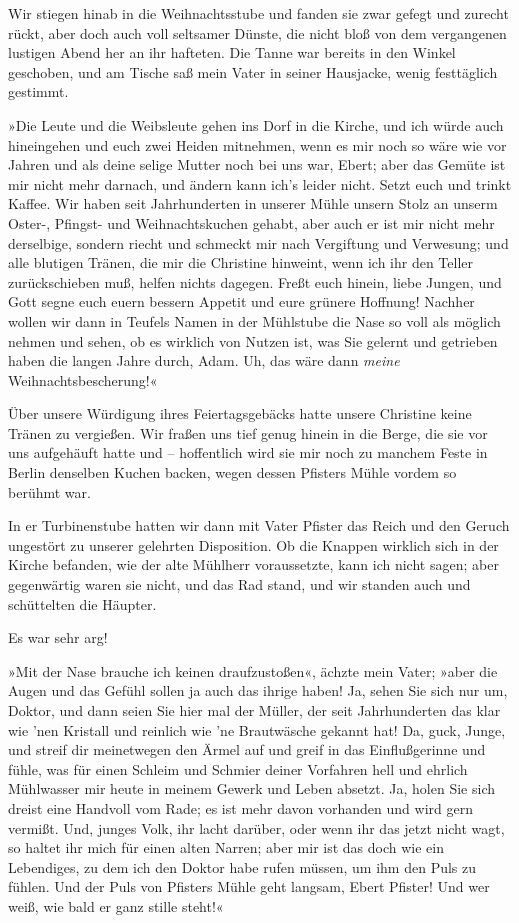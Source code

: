 Wir stiegen hinab in die Weihnachtsstube und fanden sie zwar gefegt
und zurecht rückt, aber doch auch voll seltsamer Dünste, die nicht
bloß von dem vergangenen lustigen Abend her an ihr hafteten. Die
Tanne war bereits in den Winkel geschoben, und am Tische saß mein
Vater in seiner Hausjacke, wenig festtäglich gestimmt.

»Die Leute und die Weibsleute gehen ins Dorf in die Kirche, und ich
würde auch hineingehen und euch zwei Heiden mitnehmen, wenn es mir
noch so wäre wie vor Jahren und als deine selige Mutter noch bei
uns war, Ebert; aber das Gemüte ist mir nicht mehr darnach, und
ändern kann ich's leider nicht. Setzt euch und trinkt Kaffee. Wir
haben seit Jahrhunderten in unserer Mühle unsern Stolz an unserm
Oster-, Pfingst- und Weihnachtskuchen gehabt, aber auch er ist mir
nicht mehr derselbige, sondern riecht und schmeckt mir nach
Vergiftung und Verwesung; und alle blutigen Tränen, die mir die
Christine hinweint, wenn ich ihr den Teller zurückschieben muß,
helfen nichts dagegen. Freßt euch hinein, liebe Jungen, und Gott
segne euch euern bessern Appetit und eure grünere Hoffnung! Nachher
wollen wir dann in Teufels Namen in der Mühlstube die Nase so voll
als möglich nehmen und sehen, ob es wirklich von Nutzen ist, was
Sie gelernt und getrieben haben die langen Jahre durch, Adam. Uh,
das wäre dann \emph{meine} Weihnachtsbescherung!«

Über unsere Würdigung ihres Feiertagsgebäcks hatte unsere Christine
keine Tränen zu vergießen. Wir fraßen uns tief genug hinein in die
Berge, die sie vor uns aufgehäuft hatte und – hoffentlich wird sie
mir noch zu manchem Feste in Berlin denselben Kuchen backen, wegen
dessen Pfisters Mühle vordem so berühmt war.

In er Turbinenstube hatten wir dann mit Vater Pfister das Reich und
den Geruch ungestört zu unserer gelehrten Disposition. Ob die
Knappen wirklich sich in der Kirche befanden, wie der alte Mühlherr
voraussetzte, kann ich nicht sagen; aber gegenwärtig waren sie
nicht, und das Rad stand, und wir standen auch und schüttelten die
Häupter.

Es war sehr arg!

»Mit der Nase brauche ich keinen draufzustoßen«, ächzte mein Vater;
»aber die Augen und das Gefühl sollen ja auch das ihrige haben! Ja,
sehen Sie sich nur um, Doktor, und dann seien Sie hier mal der
Müller, der seit Jahrhunderten das klar wie 'nen Kristall und
reinlich wie 'ne Brautwäsche gekannt hat! Da, guck, Junge, und
streif dir meinetwegen den Ärmel auf und greif in das
Einflußgerinne und fühle, was für einen Schleim und Schmier deiner
Vorfahren hell und ehrlich Mühlwasser mir heute in meinem Gewerk
und Leben absetzt. Ja, holen Sie sich dreist eine Handvoll vom
Rade; es ist mehr davon vorhanden und wird gern vermißt. Und,
junges Volk, ihr lacht darüber, oder wenn ihr das jetzt nicht wagt,
so haltet ihr mich für einen alten Narren; aber mir ist das doch
wie ein Lebendiges, zu dem ich den Doktor habe rufen müssen, um ihm
den Puls zu fühlen. Und der Puls von Pfisters Mühle geht langsam,
Ebert Pfister! Und wer weiß, wie bald er ganz stille steht!«

